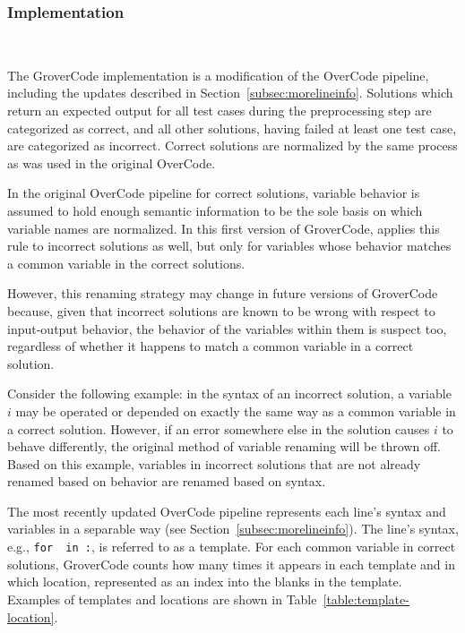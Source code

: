 \subsubsection{Implementation}~\label{subsec:grovercodepipeline}

The GroverCode implementation is a modification of the OverCode pipeline, including the updates described in Section~\ref{subsec:morelineinfo}. Solutions which return an expected output for all test cases during the preprocessing step are categorized as correct, and all other solutions, having failed at least one test case, are categorized as incorrect. Correct solutions are normalized by the same process as was used in the original OverCode. 

In the original OverCode pipeline for correct solutions, variable behavior is assumed to hold enough semantic information to be the sole basis on which variable names are normalized. In this first version of GroverCode, applies this rule to incorrect solutions as well, but only for variables whose behavior matches a common variable in the correct solutions. %

However, this renaming strategy may change in future versions of GroverCode because, given that incorrect solutions are known to be wrong with respect to input-output behavior, the behavior of the variables within them is suspect too, regardless of whether it happens to match a common variable in a correct solution.

Consider the following example: in the syntax of an incorrect solution, a variable $i$ may be operated or depended on exactly the same way as a common variable in a correct solution. However, if an error somewhere else in the solution causes $i$ to behave differently, the original method of variable renaming will be thrown off. Based on this example, variables in incorrect solutions that are not already renamed based on behavior are renamed based on syntax.

The most recently updated OverCode pipeline represents each line's syntax and variables in a separable way (see Section~\ref{subsec:morelineinfo}). The line's syntax, e.g., \texttt{for \underline{\hspace{1em}} in \underline{\hspace{1em}}:}, is referred to as a template. For each common variable in correct solutions, GroverCode counts how many times it appears in each template and in which location, represented as an index into the blanks in the template. Examples of templates and locations are shown in Table~\ref{table:template-location}. 


